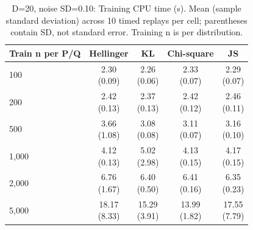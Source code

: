 \begin{table}[t]
\centering
\small
\setlength{\tabcolsep}{4pt}
\caption{D=20, noise SD=0.10: Training CPU time (s). Mean (sample standard deviation) across 10 timed replays per cell; parentheses contain SD, not standard error. Training n is per distribution.}
\label{tab:sim-d-20-noise-sd-0-10-training-cpu-time-s}
\begin{tabular}{lcccc}
\toprule
Train n per P/Q & Hellinger & KL & Chi-square & JS \\
\midrule
100 & \shortstack{2.30\\(0.09)} & \shortstack{2.26\\(0.06)} & \shortstack{2.33\\(0.07)} & \shortstack{2.29\\(0.07)} \\
200 & \shortstack{2.42\\(0.13)} & \shortstack{2.37\\(0.13)} & \shortstack{2.42\\(0.12)} & \shortstack{2.46\\(0.11)} \\
500 & \shortstack{3.66\\(1.08)} & \shortstack{3.08\\(0.08)} & \shortstack{3.11\\(0.07)} & \shortstack{3.16\\(0.10)} \\
1,000 & \shortstack{4.12\\(0.13)} & \shortstack{5.02\\(2.98)} & \shortstack{4.13\\(0.15)} & \shortstack{4.17\\(0.15)} \\
2,000 & \shortstack{6.76\\(1.67)} & \shortstack{6.40\\(0.50)} & \shortstack{6.41\\(0.16)} & \shortstack{6.35\\(0.23)} \\
5,000 & \shortstack{18.17\\(8.33)} & \shortstack{15.29\\(3.91)} & \shortstack{13.99\\(1.82)} & \shortstack{17.55\\(7.79)} \\
\bottomrule
\end{tabular}
\end{table}


